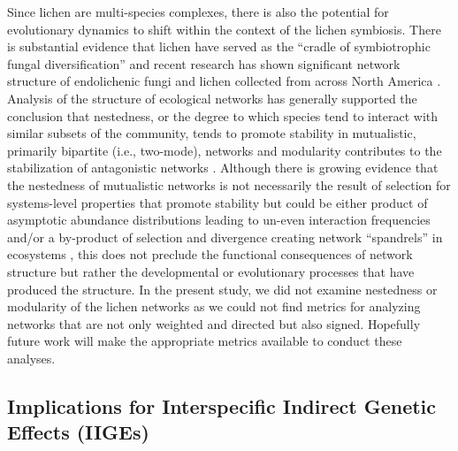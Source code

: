 \documentclass[11pt,twocolumn,twoside,lineno]{pnas-new}
\begin{document}
Since lichen are multi-species complexes, there is also the potential
for evolutionary dynamics to shift within the context of the lichen
symbiosis. There is substantial evidence that lichen have served as
the ``cradle of symbiotrophic fungal diversification''
\cite{Arnold2009} and recent research has shown significant network
structure of endolichenic fungi and lichen collected from across North
America \cite{Chagnon2016}. Analysis of the structure of ecological
networks has generally supported the conclusion that nestedness, or
the degree to which species tend to interact with similar subsets of
the community, tends to promote stability in mutualistic, primarily
bipartite (i.e., two-mode), networks and modularity contributes to the
stabilization of antagonistic networks \cite{Thebault2011,
  Grilli2016}. Although there is growing evidence that the nestedness
of mutualistic networks is not necessarily the result of selection for
systems-level properties that promote stability but could be either
product of asymptotic abundance distributions leading to un-even
interaction frequencies \cite{Staniczenko2012} and/or a by-product of
selection and divergence creating network ``spandrels'' in ecosystems
\cite{Valverde2018TheSpandrel}, this does not preclude the functional
consequences of network structure but rather the developmental or
evolutionary processes that have produced the structure. In the
present study, we did not examine nestedness or modularity of the
lichen networks as we could not find metrics for analyzing networks
that are not only weighted and directed but also signed. Hopefully
future work will make the appropriate metrics available to conduct
these analyses.

\subsection*{Implications for Interspecific Indirect Genetic Effects (IIGEs)}
\end{document}
